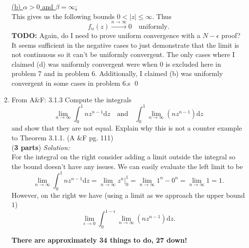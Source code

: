 \documentclass[10pt]{amsart}
\newcommand{\D}{\mathrm{d}}
\theoremstyle{nonumberplain}
\begin{document}
\begin{enumerate}[label={\bf {\arabic*}:}]
\underline{(b) $\alpha > 0$ and $\beta = \infty$:} \\
This gives us the following bounds $0 < |z| \leq \infty$.
Thus
$$
f_n(z) \overset{n \to \infty}{\longrightarrow} 0 \quad \text{uniformly}.
$$
\textbf{TODO:} Again, do I need to prove uniform convergence with a $N-\epsilon$ proof?
It seems sufficient in the negative cases to just demonstrate that the limit is not continuous so it can't be uniformly convergent.
The only cases where I claimed (d) was uniformly convergent were when 0 is excluded here in problem 7 and in problem 6.
Additionally, I claimed (b) was uniformly convergent in some cases in problem 6.s
\qed \\

\newpage
\item From A\&F: 3.1.3
Compute the integrals
$$
\lim_{n \rightarrow \infty} \int_0^1 nz^{n -1}\D z \quad \text{and} \quad \int_0^1 \lim_{n \rightarrow \infty} \left(nz^{n -1} \right) \D z
$$
and show that they are not equal.
Explain why this is not a counter example to Theorem 3.1.1. (A \&F pg. 111) \\
(\textbf{3 parts})
\textit{Solution:} \\
For the integral on the right consider adding a limit outside the integral so the bound doesn't have any issues.
We can easily evaluate the left limit to be
$$
\lim_{n \rightarrow \infty} \int_0^1 nz^{n -1}\D z = \lim_{n \rightarrow \infty} \left. z^n \right|_0^1 = \lim_{n \rightarrow \infty} 1^n - 0^n = \lim_{n \rightarrow \infty} 1 = 1.
$$
However, on the right we have (using a limit as we approach the upper bound $1$)
$$
\lim_{\epsilon \rightarrow 0}\int_0^{1-\epsilon} \lim_{n \rightarrow \infty} \left(nz^{n -1} \right) \D z.
$$
    
\textbf{There are approximately 34 things to do, 27 down!}
\end{enumerate}
\end{document}

